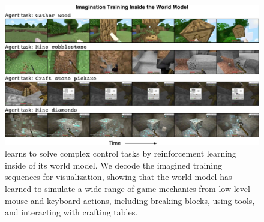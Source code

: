\begin{figure}[h!]
\centering
\includegraphics[width=\linewidth]{figures/imag/imag}
\vspace*{-3ex}
\caption{\method learns to solve complex control tasks by reinforcement learning inside of its world model.
We decode the imagined training sequences for visualization, showing that the world model has learned to simulate a wide range of game mechanics from low-level mouse and keyboard actions, including breaking blocks, using tools, and interacting with crafting tables.
}
\label{fig:imag}
\vspace*{-1.5ex}
\end{figure}
